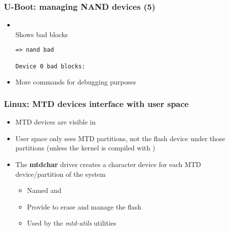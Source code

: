 \begin{frame}[fragile]
  \frametitle{U-Boot: managing NAND devices (5)}
  \begin{itemize}
  \item {}\\
    Shows bad blocks
    \begin{block}{}
    \footnotesize
    \begin{verbatim}
=> nand bad

Device 0 bad blocks:
    \end{verbatim}
    \end{block}
  \item More commands for debugging purposes
  \end{itemize}
\end{frame}


\begin{frame}
  \frametitle{Linux: MTD devices interface with user space}
  \begin{itemize}
  \item MTD devices are visible in 
  \item User space only sees MTD partitions, not the flash device
    under those partitions (unless the kernel is compiled with
    )
  \item The {\bf mtdchar} driver creates a character device for each
    MTD device/partition of the system
    \begin{itemize}
    \item Named  and 
    \item Provide  to erase and manage the flash
    \item Used by the {\em mtd-utils} utilities
    \end{itemize}
  \end{itemize}
\end{frame}

